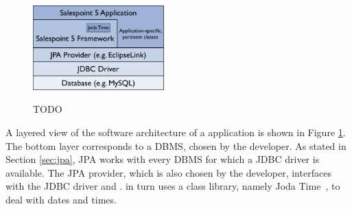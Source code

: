 \begin{figure}[ht]
	\centering
  \includegraphics[width=0.45\textwidth]{images/sp5-layered.pdf}
	\label{sp5-layered}
	\caption{TODO}
\end{figure}
A layered view of the software architecture of a \salespoint{} application is shown in Figure \ref{sp5-layered}.
The bottom layer corresponds to a DBMS, chosen by the developer.
As stated in Section \ref{sec:jpa}, JPA works with every DBMS for which a JDBC driver is available.
The JPA provider, which is also chosen by the developer, interfaces with the JDBC driver and \salespoint{}.
\salespoint{} in turn uses a class library, namely Joda Time~\cite{jodatime}, to deal with dates and times.
